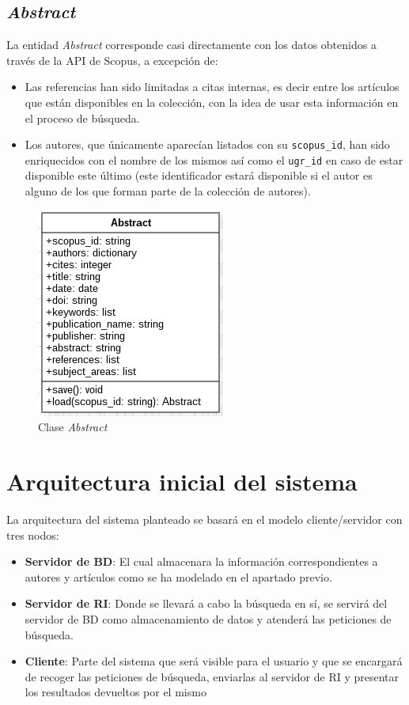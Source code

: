 \subsection{\textit{Abstract}}
\label{subsc:abstract}
La entidad \textit{Abstract} corresponde casi directamente con los datos obtenidos a través de la \acrshort{API} de Scopus, a excepción de:
\begin{itemize}
	\item Las referencias han sido limitadas a citas internas, es decir entre los artículos que están disponibles en la colección, con la idea de usar esta información en el proceso de búsqueda.
	\item Los autores, que únicamente aparecían listados con su \texttt{scopus\_id}, han sido enriquecidos con el nombre de los mismos así como el \texttt{ugr\_id} en caso de estar disponible este último (este identificador estará disponible si el autor es alguno de los que forman parte de la colección de autores).
\end{itemize}

\begin{figure}[h]
	
	\centering
	\includegraphics[width=0.5\linewidth]{imagenes/Abstract}
	\caption{Clase \textit{Abstract}}
\end{figure}

\newpage

\section{Arquitectura inicial del sistema}
\label{sc:arq_inicial}
La arquitectura del sistema planteado se basará en el modelo cliente/servidor con tres nodos:
\begin{itemize}
	\item \textbf{Servidor de \acrlong{BD}}: El cual almacenara la información correspondientes a autores y artículos como se ha modelado en el apartado previo.
	\item \textbf{Servidor de \acrshort{RI}}: Donde se llevará a cabo la búsqueda en sí, se servirá del servidor de \acrshort{BD} como almacenamiento de datos y atenderá las peticiones de búsqueda.
	\item \textbf{Cliente}: Parte del sistema que será visible para el usuario y que se encargará de recoger las peticiones de búsqueda, enviarlas al servidor de \acrshort{RI} y presentar los resultados devueltos por el mismo
\end{itemize}

